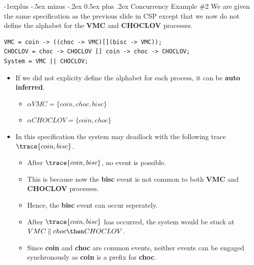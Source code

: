 \documentclass[10pt, landscape]{article}
\makeatletter
\renewcommand{\subsection}{\@startsection{subsection}{2}{0mm}%
  {-1explus -.5ex minus -.2ex}%
  {0.5ex plus .2ex}%
{\normalfont\normalsize\bfseries}}
\makeatother
\begin{document}
\begin{multicols*}{2}
  \subsection{Concurrency Example \#2}
  We are given the same specification as the previous slide in CSP except that we now do not define the alphabet for the \textbf{VMC} and \textbf{CHOCLOV} processes.
\begin{lstlisting}
VMC = coin -> ((choc -> VMC)[](bisc -> VMC));
CHOCLOV = choc -> CHOCLOV [] coin -> choc -> CHOCLOV;
System = VMC || CHOCLOV;
\end{lstlisting}
  \begin{itemize}
  \item If we did not explicity define the alphabet for each process, it can be \textbf{auto inferred}.
  \begin{itemize}
    \item $\alpha VMC = \{coin, choc, bisc\}$
    \item $\alpha CHOCLOV = \{coin, choc\}$
  \end{itemize}
  \item In this specification the system may deadlock with the following trace $\trace{coin, bisc}$.
  \begin{itemize}
    \item After $\trace{coin, bisc}$, no event is possible.
    \item This is because now the \textbf{bisc} event is not common to both \textbf{VMC} and \textbf{CHOCLOV} processes.
    \item Hence, the \textbf{bisc} event can occur seperately.
    \item After $\trace{coin, bisc}$ has occurred, the system would be stuck at $VMC \parallel choc \then CHOCLOV$.
    \item Since \textbf{coin} and \textbf{choc} are common events, neither events can be engaged synchronously as \textbf{coin} is a prefix for \textbf{choc}.
  \end{itemize}
  \end{itemize}
  

\end{multicols*}
\end{document}
